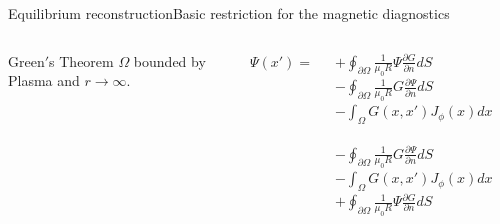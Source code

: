 \documentclass{beamer}
\begin{document}
 \begin{frame}{Equilibrium reconstruction}{Basic restriction for  the magnetic diagnostics }
 \begin{columns}
	\begin{block}{Green$'$s Theorem }
		$\Omega$ bounded by Plasma and $r \to \infty$.
	\end{block}

 
$\Psi (x') = $  

	  {   
			$ + \oint_{\partial \Omega} \frac{1}{\mu_0 R} \Psi  \frac{\partial G }{\partial n}  dS$ \\
			$  - \oint_{\partial \Omega} \frac{1}{\mu_0 R} G \frac{\partial \Psi }{\partial n} dS $
			} 	 
	\only<2>  {   $ - \int_\Omega G(x,x') J_\phi (x) d x$\\
 \\
			$  - \oint_{\partial \Omega} \frac{1}{\mu_0 R} G \frac{\partial \Psi }{\partial n} dS $} 	 
	\only<3>  {   $ - \int_\Omega G(x,x') J_\phi (x) d x$\\
  			$ + \oint_{\partial \Omega} \frac{1}{\mu_0 R} \Psi  \frac{\partial G }{\partial n}  dS$ \\
			} 	 
 	

\end{columns}
\end{frame}
\end{document}
